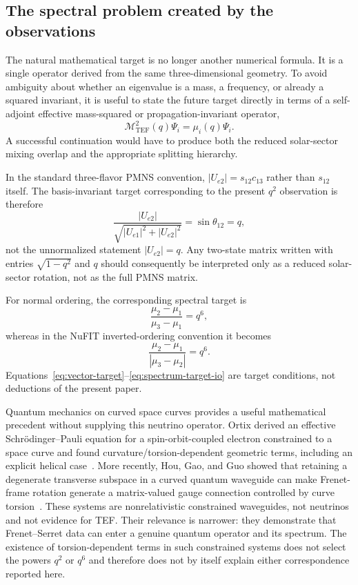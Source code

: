 \documentclass[10pt,twocolumn]{article}
\newcommand{\TEF}{\mathrm{TEF}}
\begin{document}
\subsection{The spectral problem created by the observations}

The natural mathematical target is no longer another numerical formula.  It is a
single operator derived from the same three-dimensional geometry.
To avoid ambiguity about whether an eigenvalue is a mass, a frequency, or already
a squared invariant, it is useful to state the future target directly in terms of
a self-adjoint effective mass-squared or propagation-invariant operator,
\begin{equation}
\boxed{
\mathcal M_{\TEF}^{2}(q)\Psi_i
=
\mu_i(q)\Psi_i.
}
\label{eq:operator}
\end{equation}
A successful continuation would have to produce both the reduced solar-sector
mixing overlap and the appropriate splitting hierarchy.

In the standard three-flavor PMNS convention,
$|U_{e2}|=s_{12}c_{13}$ rather than $s_{12}$ itself.  The basis-invariant target
corresponding to the present $q^2$ observation is therefore
\begin{equation}
\boxed{
\frac{|U_{e2}|}
{\sqrt{|U_{e1}|^2+|U_{e2}|^2}}
=
\sin\theta_{12}
=
q,
}
\label{eq:vector-target}
\end{equation}
not the unnormalized statement $|U_{e2}|=q$.
Any two-state matrix written with entries
$\sqrt{1-q^2}$ and $q$ should consequently be interpreted only as a reduced
solar-sector rotation, not as the full PMNS matrix.

For normal ordering, the corresponding spectral target is
\begin{equation}
\boxed{
\frac{\mu_2-\mu_1}
{\mu_3-\mu_1}
=
q^6,
}
\label{eq:spectrum-target-no}
\end{equation}
whereas in the NuFIT inverted-ordering convention it becomes
\begin{equation}
\boxed{
\frac{\mu_2-\mu_1}
{|\mu_3-\mu_2|}
=
q^6.
}
\label{eq:spectrum-target-io}
\end{equation}
Equations~\eqref{eq:vector-target}--\eqref{eq:spectrum-target-io} are target
conditions, not deductions of the present paper.

Quantum mechanics on curved space curves provides a useful mathematical precedent
without supplying this neutrino operator.  Ortix derived an effective
Schr\"odinger--Pauli equation for a spin-orbit-coupled electron constrained to a
space curve and found curvature/torsion-dependent geometric terms, including an
explicit helical case~\cite{Ortix2015}.  More recently, Hou, Gao, and Guo showed
that retaining a degenerate transverse subspace in a curved quantum waveguide can
make Frenet-frame rotation generate a matrix-valued gauge connection controlled by
curve torsion~\cite{Hou2026}.  These systems are nonrelativistic constrained
waveguides, not neutrinos and not evidence for TEF.  Their relevance is narrower:
they demonstrate that Frenet--Serret data can enter a genuine quantum operator and
its spectrum.  The existence of torsion-dependent terms in such constrained
systems does not select the powers $q^2$ or $q^6$ and therefore does not by itself
explain either correspondence reported here.
\end{document}
